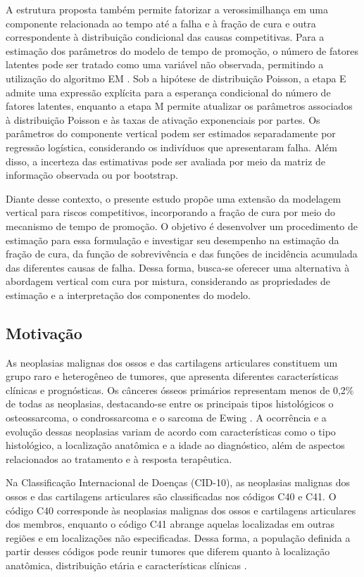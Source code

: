 \documentclass[11pt,a4paper]{article}
\begin{document}
A estrutura proposta também permite fatorizar a verossimilhança em uma componente relacionada ao tempo até a falha e à fração de cura e outra correspondente à distribuição condicional das causas competitivas. Para a estimação dos parâmetros do modelo de tempo de promoção, o número de fatores latentes pode ser tratado como uma variável não observada, permitindo a utilização do algoritmo EM \citep{dempster1977maximum}. Sob a hipótese de distribuição Poisson, a etapa E admite uma expressão explícita para a esperança condicional do número de fatores latentes, enquanto a etapa M permite atualizar os parâmetros associados à distribuição Poisson e às taxas de ativação exponenciais por partes. Os parâmetros do componente vertical podem ser estimados separadamente por regressão logística, considerando os indivíduos que apresentaram falha. Além disso, a incerteza das estimativas pode ser avaliada por meio da matriz de informação observada \citep{louis1982finding} ou por bootstrap.


Diante desse contexto, o presente estudo propõe uma extensão da modelagem vertical para riscos competitivos, incorporando a fração de cura por meio do mecanismo de tempo de promoção. O objetivo é desenvolver um procedimento de estimação para essa formulação e investigar seu desempenho na estimação da fração de cura, da função de sobrevivência e das funções de incidência acumulada das diferentes causas de falha. Dessa forma, busca-se oferecer uma alternativa à abordagem vertical com cura por mistura, considerando as propriedades de estimação e a interpretação dos componentes do modelo.
\vspace{-0.2cm}
\subsection{Motivação}
As neoplasias malignas dos ossos e das cartilagens articulares constituem um grupo raro e heterogêneo de tumores, que apresenta diferentes características clínicas e prognósticas. Os cânceres ósseos primários representam menos de 0,2\% de todas as neoplasias, destacando-se entre os principais tipos histológicos o osteossarcoma, o condrossarcoma e o sarcoma de Ewing \citep{biermann2025bone}. A ocorrência e a evolução dessas neoplasias variam de acordo com características como o tipo histológico, a localização anatômica e a idade ao diagnóstico, além de aspectos relacionados ao tratamento e à resposta terapêutica.

Na Classificação Internacional de Doenças (CID-10), as neoplasias malignas dos ossos e das cartilagens articulares são classificadas nos códigos C40 e C41. O código C40 corresponde às neoplasias malignas dos ossos e cartilagens articulares dos membros, enquanto o código C41 abrange aquelas localizadas em outras regiões e em localizações não especificadas. Dessa forma, a população definida a partir desses códigos pode reunir tumores que diferem quanto à localização anatômica, distribuição etária e características clínicas \citep{organizaccao1994cid}.
\end{document}
